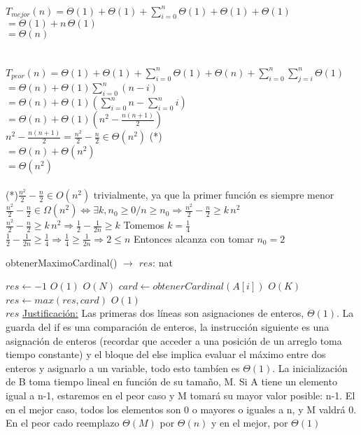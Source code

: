 \documentclass[10pt, a4paper]{article}
\begin{document}
$T_{mejor}(n) = \Theta (1) + \Theta (1) + \sum_{i=0}^{n} \Theta (1) +\Theta (1) + \Theta (1)$\\
 $= \Theta (1) + n \, \Theta (1)$\\
 $= \Theta (n)$\\ \\ \\
 
$T_{peor}(n) = \Theta (1) + \Theta (1) + \sum_{i=0}^{n} \Theta (1) +\Theta (n) + \sum_{i=0}^{n} \sum_{j=i}^{n} \Theta (1)$\\
$= \Theta (n) +\Theta (1) \sum_{i=0}^{n}(n-i)$ \\
$= \Theta (n) +\Theta (1) (\sum_{i=0}^{n}n - \sum_{i=0}^{n}i)$\\
$= \Theta (n) +\Theta (1) (n^2 - \frac{n(n+1)}{2})$\\
$n^2 - \frac{n(n+1)}{2} = \frac{n^2}{2} - \frac{n}{2} \in \Theta (n^2)$ (*)\\
$= \Theta (n) +\Theta (n^2)$\\
$=\Theta (n^2)$\\ \\

(*)$\frac{n^2}{2} - \frac{n}{2} \in O(n^2)$ trivialmente, ya que la primer función es siempre menor\\
$\frac{n^2}{2} - \frac{n}{2} \in \Omega (n^2) \Leftrightarrow \exists k, n_0 \ge 0 / n\ge n_0 \Rightarrow \frac{n^2}{2} - \frac{n}{2} \ge k \, n^2$\\
$\frac{n^2}{2} - \frac{n}{2} \ge k \, n^2 \Rightarrow  \frac{1}{2} - \frac{1}{2n} \ge k$ Tomemos $k = \frac{1}{4}$\\
$\frac{1}{2} - \frac{1}{2n} \ge \frac{1}{4} \Rightarrow \frac{1}{4} \ge \frac{1}{2n} \Rightarrow 2 \le n$ Entonces alcanza con tomar $n_0 = 2$

\begin{algorithm}[H]{obtenerMaximoCardinal() $\to$ $res$: nat}	
	\begin{algorithmic}[1]
			 \State $res \gets -1$			\Comment $O(1)$
			 			\Comment $O(N)$
			 	\State $card\gets obtenerCardinal(A[i])$			\Comment $O(K)$
			 	\State $res\gets max(res, card)$			\Comment $O(1)$
			 \EndFor \\
			\Return $res$
		\medskip
		\Statex \underline{Justificación:} Las primeras dos líneas son asignaciones de enteros, $\Theta(1)$. La guarda del if es una comparación de enteros, la instrucción siguiente es una asignación de enteros (recordar que acceder a una posición de un arreglo toma tiempo constante) y el bloque del else implica evaluar el máximo entre dos enteros y asignarlo a un variable, todo esto tambíen es $\Theta(1)$. La inicialización de B toma tiempo lineal en función de su tamaño, M.
		Si A tiene un elemento igual a n-1, estaremos en el peor caso y M tomará su mayor valor posible: n-1. El en el mejor caso, todos los elementos son 0 o mayores o iguales a n, y M valdrá 0. En el peor cado reemplazo $\Theta(M)$ por $\Theta(n)$ y en el mejor, por $\Theta(1)$
    \end{algorithmic}
\end{algorithm}	
\end{document}
